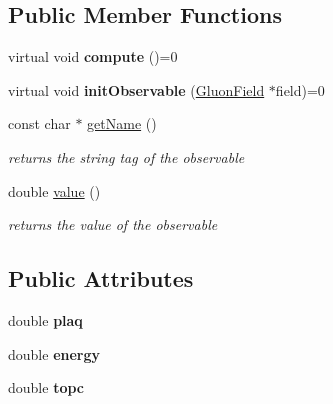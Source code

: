 \subsection*{Public Member Functions}
\begin{DoxyCompactItemize}
\item 
virtual void {\bfseries compute} ()=0\hypertarget{classObservable_a3a8881d961623cddb85416cefa1c5432}{}\label{classObservable_a3a8881d961623cddb85416cefa1c5432}

\item 
virtual void {\bfseries init\+Observable} (\hyperlink{field_8h_afe80b127697eba6d6e7fbd8121c8d4ee}{Gluon\+Field} $\ast$field)=0\hypertarget{classObservable_a1baf736c771a8a073554286571be8b09}{}\label{classObservable_a1baf736c771a8a073554286571be8b09}

\item 
const char $\ast$ \hyperlink{classObservable_ad3348c3f40782b5e09bc8dbcb8295a79}{get\+Name} ()\hypertarget{classObservable_ad3348c3f40782b5e09bc8dbcb8295a79}{}\label{classObservable_ad3348c3f40782b5e09bc8dbcb8295a79}

\begin{DoxyCompactList}\small\item\em returns the string tag of the observable \end{DoxyCompactList}\item 
double \hyperlink{classObservable_ab7931d270397e55bfe82384b52db17a0}{value} ()\hypertarget{classObservable_ab7931d270397e55bfe82384b52db17a0}{}\label{classObservable_ab7931d270397e55bfe82384b52db17a0}

\begin{DoxyCompactList}\small\item\em returns the value of the observable \end{DoxyCompactList}\end{DoxyCompactItemize}
\subsection*{Public Attributes}
\begin{DoxyCompactItemize}
\item 
double {\bfseries plaq}\hypertarget{classObservable_ad9e9bc025babb8fed348d7e16e424ae8}{}\label{classObservable_ad9e9bc025babb8fed348d7e16e424ae8}

\item 
double {\bfseries energy}\hypertarget{classObservable_afe50655b42d350df43ae1fe4ee8cf5fb}{}\label{classObservable_afe50655b42d350df43ae1fe4ee8cf5fb}

\item 
double {\bfseries topc}\hypertarget{classObservable_a18813c913b086462648c9e61d85d6be6}{}\label{classObservable_a18813c913b086462648c9e61d85d6be6}

\end{DoxyCompactItemize}
